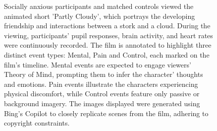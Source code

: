 \begin{figure}[!ht]
	\centering
	\caption{Socially anxious participants and matched controls viewed the animated short 'Partly Cloudy', which portrays the developing friendship and interactions between a stork and a cloud. During the viewing, participants' pupil responses, brain activity, and heart rates were continuously recorded. The film is annotated to highlight three distinct event types: Mental, Pain and Control, each marked on the film's timeline. Mental events are expected to engage viewers' Theory of Mind, prompting them to infer the character' thoughts and emotions. Pain events illustrate the characters experiencing physical discomfort, while Control events feature only passive or background imagery. The images displayed were generated using Bing's Copilot to closely replicate scenes from the film, adhering to copyright constraints.}
    \vspace*{-10pt}
	\label{fig:task-fig}
\end{figure}

